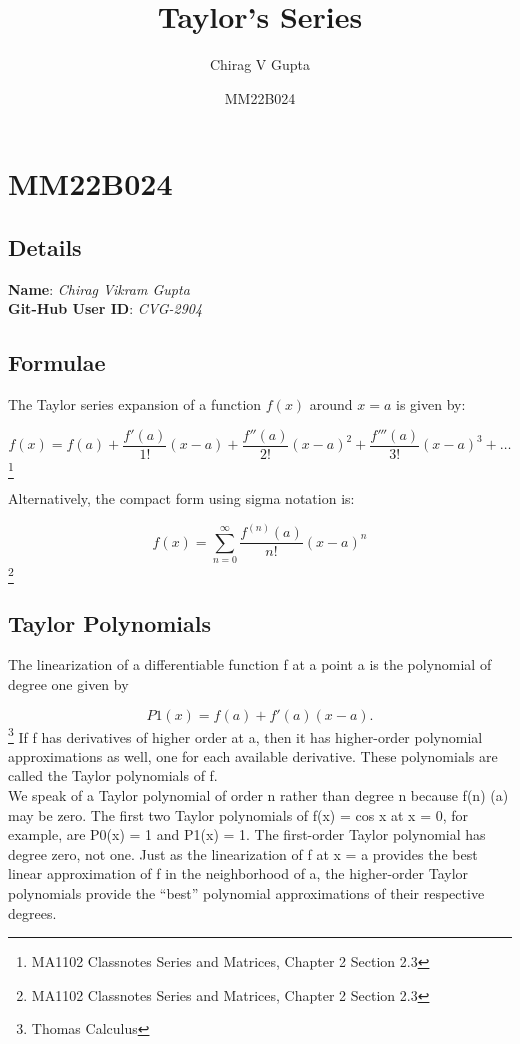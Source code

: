 \documentclass{article}
\title{\textbf{Taylor's Series}}
\author{Chirag V Gupta}
\date{MM22B024}
\begin{document}
\maketitle
\section{MM22B024}
\subsection{Details}
\textbf{Name}: \textit{Chirag Vikram Gupta} \\
\textbf{Git-Hub User ID}: \textit{CVG-2904}
\subsection{Formulae}
The Taylor series expansion of a function $f(x)$ around $x=a$ is given by:

\[
f(x) = f(a) + \frac{{f'(a)}}{{1!}}(x-a) + \frac{{f''(a)}}{{2!}}(x-a)^2 + \frac{{f'''(a)}}{{3!}}(x-a)^3 + \ldots
\] \footnote{MA1102 Classnotes
Series and Matrices, Chapter 2 Section 2.3}

Alternatively, the compact form using sigma notation is:

\[
f(x) = \sum_{n=0}^{\infty} \frac{{f^{(n)}(a)}}{{n!}}(x-a)^n
\]\footnote{MA1102 Classnotes
Series and Matrices, Chapter 2 Section 2.3}

\subsection{Taylor Polynomials}
The linearization of a differentiable function ƒ at a point a is the polynomial of degree one
given by

\[P1(x) = f(a) + f'(a)(x-a).\]
\footnote{Thomas Calculus}
If f has derivatives of higher order at a, then it has higher-order polynomial approximations as well, one for each available derivative. These polynomials are called the Taylor polynomials of f. \\
We speak of a Taylor polynomial of order n rather than degree n because ƒ(n)
(a) may
be zero. The first two Taylor polynomials of ƒ(x) = cos x at x = 0, for example, are
P0(x) = 1 and P1(x) = 1. The first-order Taylor polynomial has degree zero, not one.
Just as the linearization of ƒ at x = a provides the best linear approximation of ƒ in
the neighborhood of a, the higher-order Taylor polynomials provide the “best” polynomial
approximations of their respective degrees.
\end{document}

